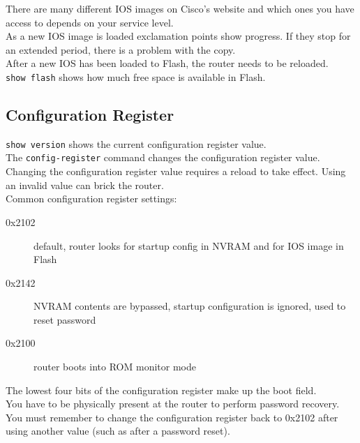 There are many different IOS images on Cisco's website and which ones you have
access to depends on your service level.\\

As a new IOS image is loaded exclamation points show progress. If they stop
for an extended period, there is a problem with the copy.\\

After a new IOS has been loaded to Flash, the router needs to be reloaded.\\

\texttt{show flash} shows how much free space is available in Flash.

\subsection{Configuration Register}

\texttt{show version} shows the current configuration register value.\\

The \texttt{config-register} command changes the configuration register value.
Changing the configuration register value requires a reload to take effect.
Using an invalid value can brick the router.\\

Common configuration register settings:

\begin{description}

\item[0x2102]
default, router looks for startup config in NVRAM and for IOS image in Flash

\item[0x2142]
NVRAM contents are bypassed, startup configuration is ignored, used to reset
password

\item[0x2100]
router boots into ROM monitor mode

\end{description}

The lowest four bits of the configuration register make up the boot field.\\

You have to be physically present at the router to perform password recovery.\\

You must remember to change the configuration register back to 0x2102 after
using another value (such as after a password reset).
